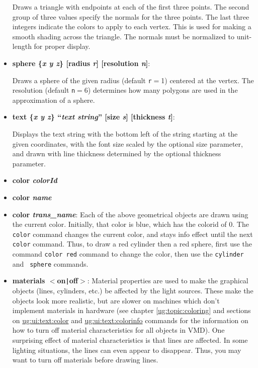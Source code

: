 \begin{itemize}
  Draws a triangle with endpoints at each of the first three
points.  The second group of three values specify the normals for the
three points.  The last three integers indicate the colors to apply to 
each vertex.  This is used for making a smooth shading across the
triangle.  The normals must be normalized to unit-length for proper display.

\item {\bf sphere \{{\it x y z}\} [radius {\it r}] [resolution {\it n}]}:

  Draws a sphere of the given radius (default {\tt r}$=$1)
centered at the vertex.  The resolution (default {\tt n}$=$6)
determines how many polygons are used in the approximation of a
sphere.

\item {\bf text \{{\it x y z}\} ``{\it text string}'' [size {\it s}] [thickness {\it t}]}:

  Displays the text string with the bottom left of the string
starting at the given coordinates, with the font size scaled by the 
optional size parameter, and drawn with line thickness determined 
by the optional thickness parameter.

\item {\bf color {\it colorId}}
\item {\bf color {\it name}}
\item {\bf color {\it trans\_name}}:
  Each of the above geometrical objects are drawn using the
current color.  Initially, that color is blue, which has the colorid
of 0.  The {\tt color} command changes the current color, and stays
info effect until the next {\tt color} command.  Thus, to draw a red
cylinder then a red sphere, first use the command {\tt color red}
command to change the color, then use the {\tt cylinder} and {\tt
sphere} commands.

\item {\bf materials $<$on\verb!|!off$>$}:
  Material properties are used to make the graphical objects
(lines, cylinders, etc.) be affected by the light sources.  These make
the objects look more realistic, but are slower on machines which
don't implement materials in hardware (see
chapter \ref{ug:topic:coloring} and
sections on \hyperref{color}{color [\S~}{]}{ug:ui:text:color} and
\hyperref{colorinfo}{colorinfo [\S~}{]}{ug:ui:text:colorinfo} commands
for the information on how to turn off
material characteristics for all objects in VMD).  One surprising
effect of material characteristics is that lines are affected.  In
some lighting situations, the lines can even appear to disappear.
Thus, you may want to turn off materials before drawing lines.


\end{itemize}
